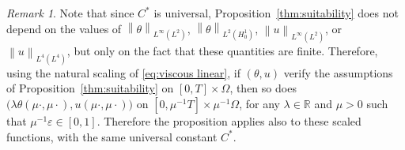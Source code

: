 \documentclass[11pt]{amsart}
\theoremstyle{remark}
\newtheorem*{remark}{Remark}
\theoremstyle{definition}
\newcommand{\R}{\mathbb{R}}
\newcommand{\eps}{\varepsilon}
\newcommand{\norm}[1]{\left\lVert#1\right\rVert}
\newcommand{\n}{^{-1}}
\newcommand{\Csuit}{C^\ast}
\begin{document}
\begin{remark}
Note that since $\Csuit$ is universal, Proposition~\ref{thm:suitability} does not depend on the values of $\norm{\theta}_{L^\infty(L^2)}$, $\norm{\theta}_{L^2(H_0^1)}$, $\norm{u}_{L^\infty(L^2)}$, or $\norm{u}_{L^4(L^4)}$, but only on the fact that these quantities are finite.  Therefore, using the natural scaling of \eqref{eq:viscous linear}, if $(\theta, u)$ verify the assumptions of Proposition~\ref{thm:suitability} on $[0,T]\times\Omega$, then so does $\big(\lambda \theta(\mu \cdot, \mu \cdot), u(\mu\cdot, \mu\cdot)\big)$ on $[0,\mu\n T] \times \mu\n \Omega$, for any $\lambda \in \R$ and $\mu > 0$ such that $\mu\n \eps \in [0,1]$.  Therefore the proposition applies also to these scaled functions, with the same universal constant $\Csuit$.  
\end{remark}
\end{document}

